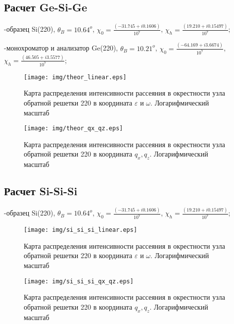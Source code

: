 \documentclass[journal]{IEEEtran}
\begin{document}
\textcolor{BrickRed}{\section{Расчет Ge-Si-Ge}}

-образец Si(220), $\theta_B = 10.64^o$, $\chi_0 = \frac{(-31.745 + i0.1606)}{10^{7}}$, 
$\chi_h = \frac{(19.210 + i0.15497)}{10^{7}}$;

-монохроматор и анализатор Ge(220),  $\theta_B = 10.21^o$, $\chi_0 = \frac{(-64.169 + i3.6674 )}{10^{7}}$, 
$\chi_h = \frac{(46.505 + i3.5577)}{10^{7}}$;

\begin{figure}[H]
\centering
\texttt{[image: img/theor\_linear.eps]}
\caption{Карта распределения интенсивности рассеяния в окрестности узла обратной решетки 220 
в координата $\varepsilon$ и $\omega$. Логарифмический масштаб}
\label{ris:maptheor1}
\end{figure}

\begin{figure}[H]
\centering
\texttt{[image: img/theor\_qx\_qz.eps]}
\caption{Карта распределения интенсивности рассеяния в окрестности узла обратной решетки 220 
в координата $q_x, q_z$. Логарифмический масштаб}
\label{ris:maptheor2}
\end{figure}

\textcolor{BrickRed}{\section{Расчет Si-Si-Si}}

-образец Si(220), $\theta_B = 10.64^o$, $\chi_0 = \frac{(-31.745 + i0.1606)}{10^{7}}$, 
$\chi_h = \frac{(19.210 + i0.15497)}{10^{7}}$;

\begin{figure}[H]
\centering
\texttt{[image: img/si\_si\_si\_linear.eps]}
\caption{Карта распределения интенсивности рассеяния в окрестности узла обратной решетки 220 
в координата $\varepsilon$ и $\omega$. Логарифмический масштаб}
\label{ris:maptheor1}
\end{figure}

\begin{figure}[H]
\centering
\texttt{[image: img/si\_si\_si\_qx\_qz.eps]}
\caption{Карта распределения интенсивности рассеяния в окрестности узла обратной решетки 220 
в координата $q_x, q_z$. Логарифмический масштаб}
\label{ris:maptheor2}
\end{figure}
\end{document}
